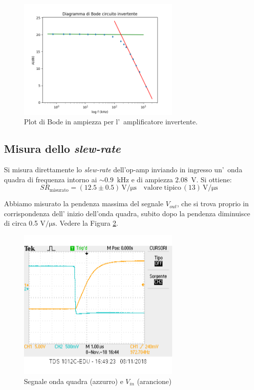 \documentclass[10pt,a4paper]{article}
\begin{document}
	
	
	\begin{figure}[h]
		\begin{center}
			
			\includegraphics[width=0.7\textwidth]{bodeInvertente}
			\caption{\small Plot di Bode in ampiezza per l'~amplificatore invertente.}
			\label{fig:bodeinv}
		\end{center}
	\end{figure}
	\subsection{Misura dello \emph{slew-rate}}
	Si misura direttamente lo \emph{slew-rate} dell'op-amp inviando in ingresso un'~onda quadra 
	di frequenza intorno ai $\sim 0.9$~kHz e di ampiezza $2.08$~V. Si ottiene:
	\[
	SR_\mathrm{misurato} = (12.5 \pm 0.5 )\,\mathrm{V/\mu s} \quad \mathrm{valore \; tipico}\, (13 )\,\mathrm{V/\mu s}\
	\]

Abbiamo misurato la  pendenza massima del segnale $V_{out}$, che si trova proprio  in corrispondenza dell' inizio dell'onda quadra, subito dopo la pendenza diminuisce di circa 0.5 $ \mathrm{V/\mu s}$. Vedere la Figura \ref{fig:Slew  Rate}.

\begin{figure}[h]
		\begin{center}
			
			\includegraphics[width=0.7\textwidth]{slewrate}
			\caption{\small Segnale onda quadra (azzurro) e $V_{in}$ (arancione)}
			\label{fig:Slew  Rate}
		\end{center}
	\end{figure}
\end{document}
